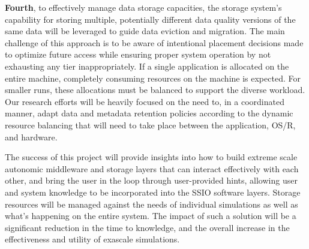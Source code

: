 \documentclass[11pt,letterpaper]{article}
\begin{document}
%
\textbf{Fourth}, to effectively manage data storage capacities, the storage
system's capability for storing multiple, potentially different data quality
versions of the same data will be leveraged to guide data eviction and migration. 
The main challenge of this approach is to be aware of intentional placement
decisions made to optimize future  access while ensuring proper system
operation by not exhausting any tier inappropriately. If a single application
is allocated on the entire machine, completely
consuming resources on the machine is expected. For smaller runs, these
allocations must be balanced to support the diverse workload. 
Our research efforts will be heavily focused on the need to, in a
coordinated manner, adapt data and metadata retention policies according to the 
dynamic resource balancing that will need to take place between the
application, OS/R, and hardware.


 

The success of this project will provide insights into how to build extreme scale
autonomic middleware and storage layers that can interact effectively with each
other, and bring the user in the loop through user-provided hints, allowing user 
and system knowledge to be incorporated into the SSIO software layers.
Storage resources will be managed against the needs of individual simulations 
as well as what's happening on the entire system. The impact of such a solution 
will be a significant reduction in the time to knowledge, and the overall increase in 
the effectiveness and utility of exascale simulations.
\end{document}
